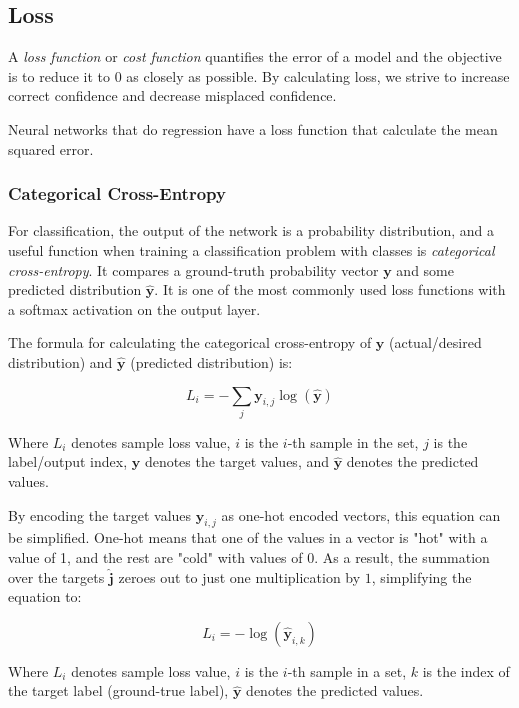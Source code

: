 \documentclass[a4paper]{article}
\newcommand{\vect}[1]{\bm{#1}}
\begin{document}
\subsection*{Loss}
A \emph{loss function} or \emph{cost function} quantifies the error of a model and the objective is to reduce it to $0$ as closely as possible. By calculating loss, we strive to increase correct confidence and decrease misplaced confidence.

Neural networks that do regression have a loss function that calculate the mean squared error.

\subsubsection*{Categorical Cross-Entropy}
For classification, the output of the network is a probability distribution, and a useful function when training a classification problem with classes is \emph{categorical cross-entropy}. It compares a ground-truth probability vector $\vect{y}$ and some predicted distribution $\vect{\hat{y}}$. It is one of the most commonly used loss functions with a softmax activation on the output layer.

The formula for calculating the categorical cross-entropy of $\vect{y}$ (actual/desired distribution) and $\vect{\hat{y}}$ (predicted distribution) is:

\begin{equation*}
    L_i = -\sum_{j} \vect{y}_{i,j} \log({\vect{\hat{y}}})
\end{equation*}

Where $L_i$ denotes sample loss value, $i$ is the $i$-th sample in the set, $j$ is the label/output index, $\vect{y}$ denotes the target values, and $\vect{\hat{y}}$ denotes the predicted values.

By encoding the target values $\vect{y}_{i,j}$ as one-hot encoded vectors, this equation can be simplified. One-hot means that one of the values in a vector is "hot" with a value of 1, and the rest are "cold" with values of 0. As a result, the summation over the targets $\vect{\hat{j}}$ zeroes out to just one multiplication by $1$, simplifying the equation to:

\begin{equation*}
    L_i = -\log(\vect{\hat{y}}_{i,k})
\end{equation*}

Where $L_i$ denotes sample loss value, $i$ is the $i$-th sample in a set, $k$ is the index of the target label (ground-true label), $\vect{\hat{y}}$ denotes the predicted values.
\end{document}
